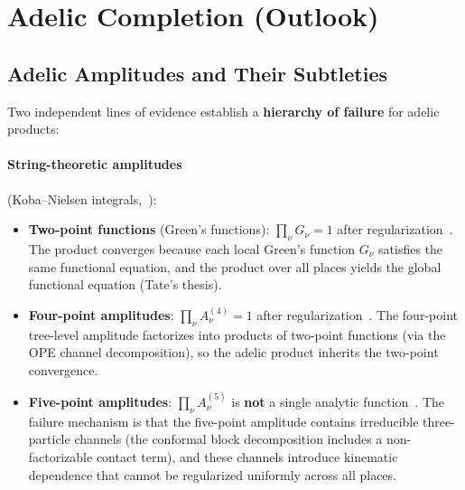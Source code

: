 \documentclass[11pt,a4paper]{article}
\begin{document}
\section{Adelic Completion (Outlook)}
\label{sec:adelic}

\subsection{Adelic Amplitudes and Their Subtleties}

Two independent lines of evidence establish a \textbf{hierarchy of failure} for adelic products:

\paragraph{String-theoretic amplitudes} (Koba--Nielsen integrals,~\cite{J22}):
\begin{itemize}[leftmargin=2em]
    \item \textbf{Two-point functions} (Green's functions): $\prod_\nu G_\nu = 1$ after regularization~\cite{HSYZ20}. The product converges because each local Green's function $G_\nu$ satisfies the same functional equation, and the product over all places yields the global functional equation (Tate's thesis).
    \item \textbf{Four-point amplitudes}: $\prod_\nu A^{(4)}_\nu = 1$ after regularization~\cite{J22}. The four-point tree-level amplitude factorizes into products of two-point functions (via the OPE channel decomposition), so the adelic product inherits the two-point convergence.
    \item \textbf{Five-point amplitudes}: $\prod_\nu A^{(5)}_\nu$ is \textbf{not} a single analytic function~\cite{J22}. The failure mechanism is that the five-point amplitude contains irreducible three-particle channels (the conformal block decomposition includes a non-factorizable contact term), and these channels introduce kinematic dependence that cannot be regularized uniformly across all places.
\end{itemize}
\end{document}
